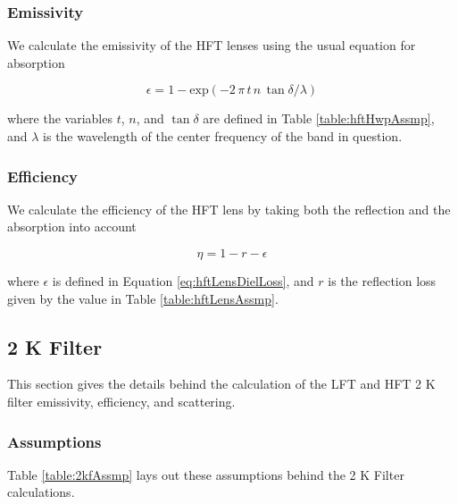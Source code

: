 \documentclass[12pt, titlepage]{article} %
\begin{document}

\subsubsection{Emissivity}

We calculate the emissivity of the HFT lenses using the usual equation for absorption

\begin{equation}
	\epsilon = 1 - \mathrm{exp} (- 2 \, \pi \, t \, n \, \tan{\delta} / \lambda )
	\label{eq:hftLensDielLoss}
\end{equation}

where the variables $t$, $n$, and $\tan{\delta}$ are defined in Table \ref{table:hftHwpAssmp}, and $\lambda$ is the wavelength of the center frequency of the band in question.


\subsubsection{Efficiency}

We calculate the efficiency of the HFT lens by taking both the reflection and the absorption into account

\begin{equation}
	\eta = 1 - r - \epsilon
\end{equation}

where $\epsilon$ is defined in Equation \ref{eq:hftLensDielLoss}, and $r$ is the reflection loss given by the value in Table \ref{table:hftLensAssmp}.


\subsection{2 K Filter}

This section gives the details behind the calculation of the LFT and HFT 2 K filter emissivity, efficiency, and scattering.


\subsubsection{Assumptions}

Table \ref{table:2kfAssmp} lays out these assumptions behind the 2 K Filter calculations.
\end{document}
